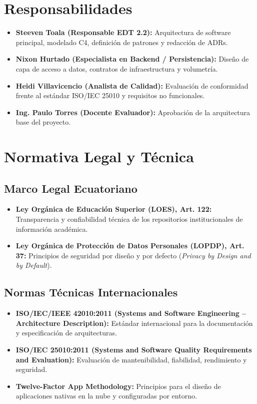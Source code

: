\documentclass[12pt,a4paper]{article}
\begin{document}
\section{Responsabilidades}
\begin{itemize}[leftmargin=1.5em, itemsep=2pt]
    \item \textbf{Steeven Toala (Responsable EDT 2.2):} Arquitectura de software principal, modelado C4, definición de patrones y redacción de ADRs.
    \item \textbf{Nixon Hurtado (Especialista en Backend / Persistencia):} Diseño de capa de acceso a datos, contratos de infraestructura y volumetría.
    \item \textbf{Heidi Villavicencio (Analista de Calidad):} Evaluación de conformidad frente al estándar ISO/IEC 25010 y requisitos no funcionales.
    \item \textbf{Ing. Paulo Torres (Docente Evaluador):} Aprobación de la arquitectura base del proyecto.
\end{itemize}

\section{Normativa Legal y Técnica}
\subsection{Marco Legal Ecuatoriano}
\begin{itemize}[leftmargin=1.5em, itemsep=2pt]
    \item \textbf{Ley Orgánica de Educación Superior (LOES), Art. 122:} Transparencia y confiabilidad técnica de los repositorios institucionales de información académica.
    \item \textbf{Ley Orgánica de Protección de Datos Personales (LOPDP), Art. 37:} Principios de seguridad por diseño y por defecto (\textit{Privacy by Design and by Default}).
\end{itemize}
\subsection{Normas Técnicas Internacionales}
\begin{itemize}[leftmargin=1.5em, itemsep=2pt]
    \item \textbf{ISO/IEC/IEEE 42010:2011 (Systems and Software Engineering -- Architecture Description):} Estándar internacional para la documentación y especificación de arquitecturas.
    \item \textbf{ISO/IEC 25010:2011 (Systems and Software Quality Requirements and Evaluation):} Evaluación de mantenibilidad, fiabilidad, rendimiento y seguridad.
    \item \textbf{Twelve-Factor App Methodology:} Principios para el diseño de aplicaciones nativas en la nube y configuradas por entorno.
\end{itemize}
\end{document}
